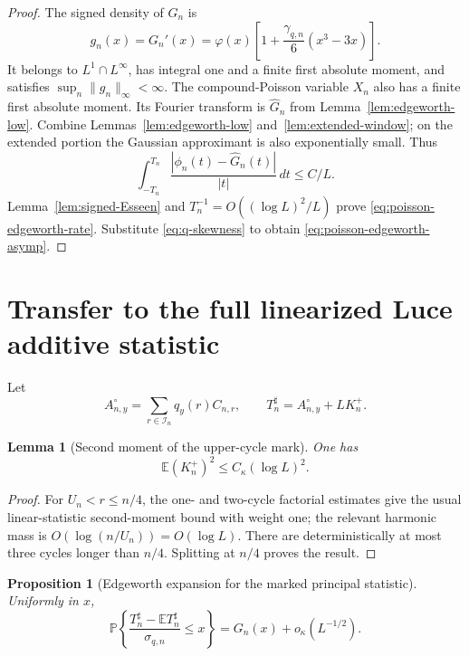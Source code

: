 \documentclass[11pt]{article}
\newtheorem{proposition}[theorem]{Proposition}
\newtheorem{lemma}[theorem]{Lemma}
\theoremstyle{remark}
\newcommand{\Pp}{\mathbb P}
\newcommand{\Ee}{\mathbb E}
\newcommand{\dd}{\,d}
\begin{document}
\begin{proof}
The signed density of $G_n$ is
\[
 g_n(x)=G_n'(x)=\varphi(x)
 \left[1+\frac{\gamma_{q,n}}6(x^3-3x)\right].
\]
It belongs to $L^1\cap L^\infty$, has integral one and a finite first
absolute moment, and satisfies
$\sup_n\|g_n\|_\infty<\infty$.  The compound-Poisson variable $X_n$
also has a finite first absolute moment.  Its Fourier transform is
$\widehat G_n$ from Lemma~\ref{lem:edgeworth-low}.  Combine
Lemmas~\ref{lem:edgeworth-low} and~\ref{lem:extended-window}; on the
extended portion the Gaussian approximant is also exponentially small.
Thus
\[
 \int_{-T_n}^{T_n}
 \frac{|\phi_n(t)-\widehat G_n(t)|}{|t|}\dd t\le C/L.
\]
Lemma~\ref{lem:signed-Esseen} and
$T_n^{-1}=O((\log L)^2/L)$ prove
\eqref{eq:poisson-edgeworth-rate}.  Substitute
\eqref{eq:q-skewness} to obtain
\eqref{eq:poisson-edgeworth-asymp}.
\end{proof}

\section{Transfer to the full linearized Luce additive statistic}
\label{sec:linearized-transfer}

Let
\[
 A_{n,y}^\circ=\sum_{r\in\mathcal I_n}q_y(r)C_{n,r},
 \qquad
 T_n^\sharp=A_{n,y}^\circ+LK_n^+.
\]

\begin{lemma}[Second moment of the upper-cycle mark]
\label{lem:upper-mark}
One has
\[
 \Ee(K_n^+)^2\le C_\kappa(\log L)^2.
\]
\end{lemma}

\begin{proof}
For $U_n<r\le n/4$, the one- and two-cycle factorial estimates give the
usual linear-statistic second-moment bound with weight one; the relevant
harmonic mass is $O(\log(n/U_n))=O(\log L)$.  There are deterministically at
most three cycles longer than $n/4$.  Splitting at $n/4$ proves the result.
\end{proof}

\begin{proposition}[Edgeworth expansion for the marked principal statistic]
\label{prop:marked-edgeworth}
Uniformly in $x$,
\begin{equation}
\label{eq:marked-edgeworth}
 \Pp\left\{
 \frac{T_n^\sharp-\Ee T_n^\sharp}{\sigma_{q,n}}\le x
 \right\}
 =G_n(x)+o_\kappa(L^{-1/2}).
\end{equation}
\end{proposition}
\end{document}
